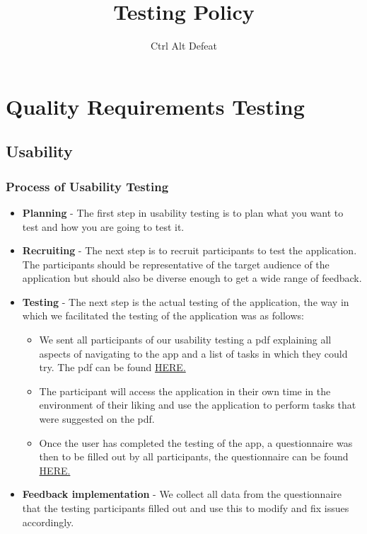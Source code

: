 \documentclass[12pt]{article}
\title{Testing Policy}
\author{Ctrl Alt Defeat}
\begin{document}

\tableofcontents
\newpage

\newpage
\section{Quality Requirements Testing}
\subsection{Usability}
\subsubsection{Process of Usability Testing}
\begin{itemize}
    \item \textbf{Planning} - The first step in usability testing is to plan what you want to test and how you are going to test it.
    \item \textbf{Recruiting} - The next step is to recruit participants to test the application. The participants should be representative of the target audience of the application but should also be diverse enough to get a wide range of feedback.
    \item \textbf{Testing} - The next step is the actual testing of the application, the way in which we facilitated the testing of the application was as follows:
          \begin{itemize}
              \item We sent all participants of our usability testing a pdf explaining all aspects of navigating to the app and a list of tasks in which they could try. The pdf can be found \href{https://github.com/COS301-SE-2023/Domain-Pulse-A-Sentiment-Analysis-Platform/blob/docs/Demo4Documentation/documentation/Testing%20Policy/Testing_Assistance_Domain_Pulse.pdf}{HERE.}
              \item The participant will access the application in their own time in the environment of their liking and use the application to perform tasks that were suggested on the pdf.
              \item Once the user has completed the testing of the app, a questionnaire was then to be filled out by all participants, the questionnaire can be found \href{https://forms.gle/P6EC4iyg7ZD93LNfA}{HERE.}
          \end{itemize}
    \item \textbf{Feedback implementation} - We collect all data from the questionnaire that the testing participants filled out and use this to modify and fix issues accordingly.
\end{itemize}
\end{document}
